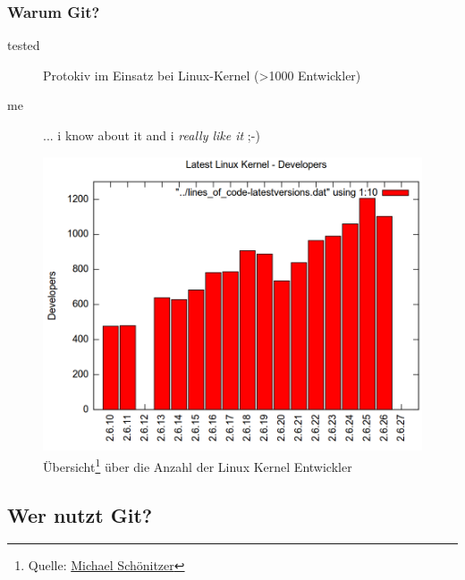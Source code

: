 \documentclass{beamer}
\begin{document}
\begin{frame}\frametitle{Warum Git?}
\begin{description}
\item[tested] Protokiv im Einsatz bei Linux-Kernel (>1000 Entwickler)
\item[me] ... i know about it and i \textit{really like it} ;-)
\end{description}

\begin{figure}
\includegraphics[scale=0.2]{Bilder/kernel_Entwickler} 
\caption{Übersicht\footnote{Quelle: \href{http://www.schoenitzer.de/lks/lks.html\#new_developers}{Michael Schönitzer}} über die Anzahl der Linux Kernel Entwickler}
\end{figure}
\end{frame}

\subsection{Wer nutzt Git?}
\end{document}
